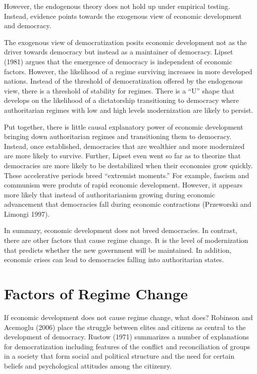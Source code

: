 \documentclass[12pt,]{article}
\begin{document}
However, the endogenous theory does not hold up under empirical testing.
Instead, evidence points towards the exogenous view of economic
development and democracy.

The exogenous view of democratization posits economic development not as
the driver towards democracy but instead as a maintainer of democracy.
Lipset (1981) argues that the emergence of democracy is independent of
economic factors. However, the likelihood of a regime surviving
increases in more developed nations. Instead of the threshold of
democratization offered by the endogenous view, there is a threshold of
stability for regimes. There is a ``U'' shape that develops on the
likelihood of a dictatorship transitioning to democracy where
authoritarian regimes with low and high levels modernization are likely
to persist.

Put together, there is little causal explanatory power of economic
development bringing down authoritarian regimes and transitioning them
to democracy. Instead, once established, democracies that are wealthier
and more modernized are more likely to survive. Further, Lipset even
went so far as to theorize that democracies are more likely to be
destabilized when their economies grow quickly. These accelerative
periods breed ``extremist moments.'' For example, fascism and communism
were produts of rapid economic development. However, it appears more
likely that instead of authoritarianism growing during economic
advancement that democracies fall during economic contractions
(Przeworski and Limongi 1997).

In summary, economic development does not breed democracies. In
contrast, there are other factors that cause regime change. It is the
level of modernization that predicts whether the new government will be
maintained. In addition, economic crises can lead to democracies falling
into authoritarian states.

\hypertarget{factors-of-regime-change}{%
\section{Factors of Regime Change}\label{factors-of-regime-change}}

If economic development does not cause regime change, what does?
Robinson and Acemoglu (2006) place the struggle between elites and
citizens as central to the development of democracy. Rustow (1971)
summarizes a number of explanations for democratization including
features of the conflict and reconciliation of groups in a society that
form social and political structure and the need for certain beliefs and
psychological attitudes among the citizenry.
\end{document}
